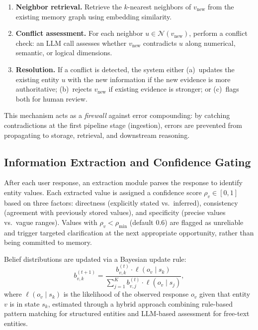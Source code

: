 \documentclass[10pt,twocolumn]{article}
\begin{document}
\begin{enumerate}[noitemsep,topsep=3pt]
  \item \textbf{Neighbor retrieval.} Retrieve the $k$-nearest neighbors of
    $v_\text{new}$ from the existing memory graph using embedding similarity.
  \item \textbf{Conflict assessment.} For each neighbor
    $u \in \mathcal{N}(v_\text{new})$, perform a conflict check: an LLM call
    assesses whether $v_\text{new}$ contradicts $u$ along numerical, semantic,
    or logical dimensions.
  \item \textbf{Resolution.} If a conflict is detected, the system either
    (a)~updates the existing entity $u$ with the new information if the new
    evidence is more authoritative; (b)~rejects $v_\text{new}$ if existing
    evidence is stronger; or (c)~flags both for human review.
\end{enumerate}

This mechanism acts as a \emph{firewall} against error compounding: by
catching contradictions at the first pipeline stage (ingestion), errors
are prevented from propagating to storage, retrieval, and downstream
reasoning.

\subsection{Information Extraction and Confidence Gating}
\label{sec:extraction}

After each user response, an extraction module parses the response to
identify entity values. Each extracted value is assigned a confidence score
$\rho_v \in [0,1]$ based on three factors: directness (explicitly stated
vs.\ inferred), consistency (agreement with previously stored values), and
specificity (precise values vs.\ vague ranges). Values with
$\rho_v < \rho_{\min}$ (default 0.6) are flagged as unreliable and trigger
targeted clarification at the next appropriate opportunity, rather than being
committed to memory.

Belief distributions are updated via a Bayesian update rule:
\begin{equation}
  b_{v,k}^{(t+1)} = \frac{b_{v,k}^{(t)} \cdot \ell(o_v \mid s_k)}
    {\sum_{j=1}^{K} b_{v,j}^{(t)} \cdot \ell(o_v \mid s_j)},
  \label{eq:belief_update}
\end{equation}
where $\ell(o_v \mid s_k)$ is the likelihood of the observed response $o_v$
given that entity $v$ is in state $s_k$, estimated through a hybrid approach
combining rule-based pattern matching for structured entities and LLM-based
assessment for free-text entities.
\end{document}
